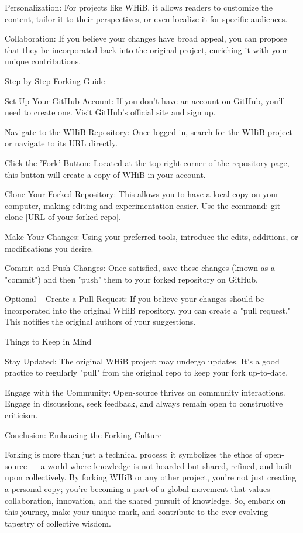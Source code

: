\documentclass[a4paper,12pt]{book}
\begin{document}
Personalization: For projects like WHiB, it allows readers to customize the content, tailor it to their perspectives, or even localize it for specific audiences.

Collaboration: If you believe your changes have broad appeal, you can propose that they be incorporated back into the original project, enriching it with your unique contributions.

Step-by-Step Forking Guide

Set Up Your GitHub Account: If you don't have an account on GitHub, you'll need to create one. Visit GitHub's official site and sign up.

Navigate to the WHiB Repository: Once logged in, search for the WHiB project or navigate to its URL directly.

Click the 'Fork' Button: Located at the top right corner of the repository page, this button will create a copy of WHiB in your account.

Clone Your Forked Repository: This allows you to have a local copy on your computer, making editing and experimentation easier. Use the command: git clone [URL of your forked repo].

Make Your Changes: Using your preferred tools, introduce the edits, additions, or modifications you desire.

Commit and Push Changes: Once satisfied, save these changes (known as a "commit") and then "push" them to your forked repository on GitHub.

Optional – Create a Pull Request: If you believe your changes should be incorporated into the original WHiB repository, you can create a "pull request." This notifies the original authors of your suggestions.

Things to Keep in Mind

Stay Updated: The original WHiB project may undergo updates. It's a good practice to regularly "pull" from the original repo to keep your fork up-to-date.

Engage with the Community: Open-source thrives on community interactions. Engage in discussions, seek feedback, and always remain open to constructive criticism.

Conclusion: Embracing the Forking Culture

Forking is more than just a technical process; it symbolizes the ethos of open-source — a world where knowledge is not hoarded but shared, refined, and built upon collectively. By forking WHiB or any other project, you're not just creating a personal copy; you're becoming a part of a global movement that values collaboration, innovation, and the shared pursuit of knowledge. So, embark on this journey, make your unique mark, and contribute to the ever-evolving tapestry of collective wisdom.
\end{document}
